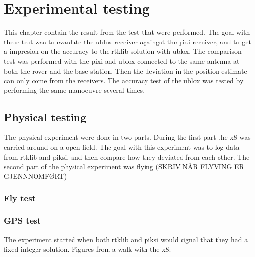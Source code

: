 
\chapter{Experimental testing}
This chapter contain the result from the test that were performed. The goal with these test was to evaulate the ublox receiver againgst the pixi receiver, and to get a impresion on the accuracy to the rtklib solution with ublox. The comparison test was performed with the pixi and ublox connected to the same antenna at both the rover and the base station. Then the deviation in the position estimate can only come from the receivers. The accuracy test of the ublox was tested by performing the same manoeuvre several times. 
\section{Physical testing}
The physical experiment were done in two parts. During the first part the x8 was carried around on a open field. The goal with this experiment was to log data from rtklib and piksi, and then compare how they deviated from each other. The second part of the physical experiment was flying (SKRIV NÅR FLYVING ER GJENNNOMFØRT)
\subsection{Fly test}

\subsection{GPS test}
The experiment started when both rtklib and piksi would signal that they had a fixed integer solution.
Figures from a walk with the x8:

